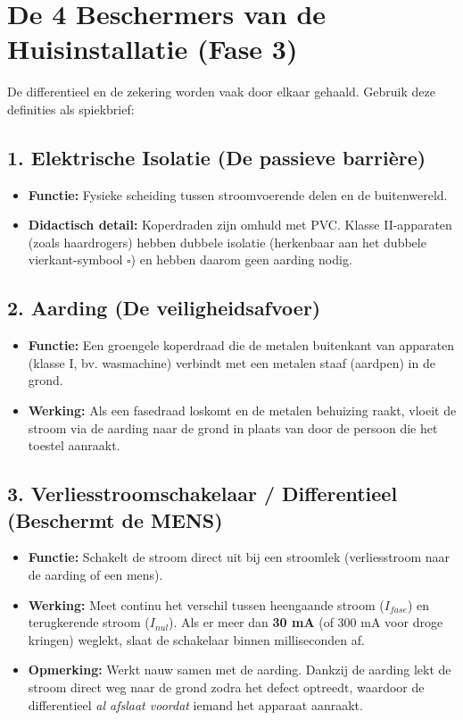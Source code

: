 \documentclass[a4paper, 11pt]{article}
\begin{document}
\section{De 4 Beschermers van de Huisinstallatie (Fase 3)}
De differentieel en de zekering worden vaak door elkaar gehaald. Gebruik deze definities als spiekbrief:

\subsection{1. Elektrische Isolatie (De passieve barrière)}
\begin{itemize}
    \item \textbf{Functie:} Fysieke scheiding tussen stroomvoerende delen en de buitenwereld.
    \item \textbf{Didactisch detail:} Koperdraden zijn omhuld met PVC. Klasse II-apparaten (zoals haardrogers) hebben dubbele isolatie (herkenbaar aan het dubbele vierkant-symbool $\square$) en hebben daarom geen aarding nodig.
\end{itemize}

\subsection{2. Aarding (De veiligheidsafvoer)}
\begin{itemize}
    \item \textbf{Functie:} Een groengele koperdraad die de metalen buitenkant van apparaten (klasse I, bv. wasmachine) verbindt met een metalen staaf (aardpen) in de grond.
    \item \textbf{Werking:} Als een fasedraad loskomt en de metalen behuizing raakt, vloeit de stroom via de aarding naar de grond in plaats van door de persoon die het toestel aanraakt.
\end{itemize}

\subsection{3. Verliesstroomschakelaar / Differentieel (Beschermt de MENS)}
\begin{itemize}
    \item \textbf{Functie:} Schakelt de stroom direct uit bij een stroomlek (verliesstroom naar de aarding of een mens).
    \item \textbf{Werking:} Meet continu het verschil tussen heengaande stroom ($I_{fase}$) en terugkerende stroom ($I_{nul}$). Als er meer dan \textbf{30 mA} (of 300 mA voor droge kringen) weglekt, slaat de schakelaar binnen milliseconden af.
    \item \textbf{Opmerking:} Werkt nauw samen met de aarding. Dankzij de aarding lekt de stroom direct weg naar de grond zodra het defect optreedt, waardoor de differentieel \textit{al afslaat voordat} iemand het apparaat aanraakt.
\end{itemize}
\end{document}
